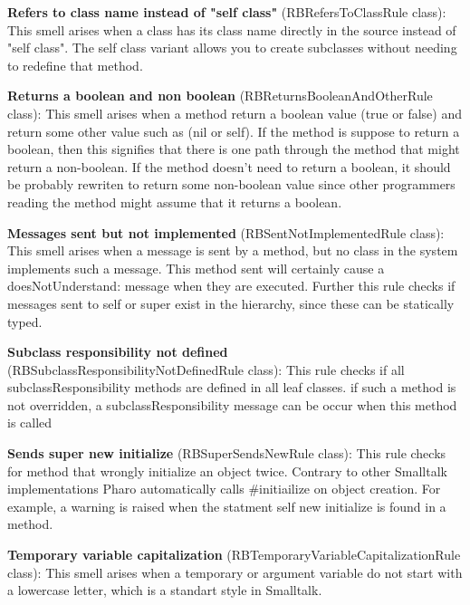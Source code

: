 \textbf{Refers to class name instead of "self class"} (RBRefersToClassRule class): This smell arises when a class has its class name directly in the source instead of "self class". The self class variant allows you to create subclasses without needing to redefine that method.

\textbf{Returns a boolean and non boolean} (RBReturnsBooleanAndOtherRule class): This smell arises when a method return a boolean value (true or false) and return some other value such as (nil or self). If the method is suppose to return a boolean, then this signifies that there is one path through the method that might return a non-boolean. If the method doesn't need to return a boolean, it should be probably rewriten to return some non-boolean value since other programmers reading the method might assume that it returns a boolean.

\textbf{Messages sent but not implemented} (RBSentNotImplementedRule class): This smell arises when a message is sent by a method,  but no class in the system implements such a message. This method sent will certainly cause a doesNotUnderstand: message when they are executed.  Further this rule checks if messages sent to self or super exist in the hierarchy, since these can be statically typed.

\textbf{Subclass responsibility not defined} (RBSubclassResponsibilityNotDefinedRule class): This rule checks if all subclassResponsibility methods are defined in all leaf classes. if such a method is not overridden, a subclassResponsibility message can be occur when this method is called

\textbf{Sends super new initialize} (RBSuperSendsNewRule class):  This rule checks for method that wrongly initialize an object twice. Contrary to other Smalltalk implementations Pharo automatically calls \#initiailize on object creation.
For example, a warning is raised when the statment self new initialize is found in a method.

\textbf{Temporary variable capitalization} (RBTemporaryVariableCapitalizationRule class): This smell arises when a temporary or argument variable do not start with a lowercase letter, which is a standart style in Smalltalk.

